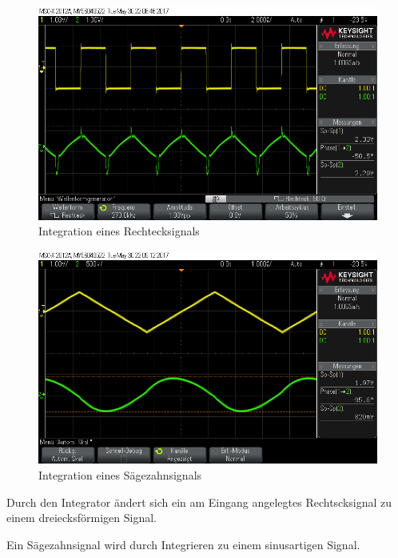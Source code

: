 \documentclass[10pt]{scrreprt}
\begin{document}
    \begin{center}
        \begin{figure}[H]
            \includegraphics[width=\textwidth]{scope_8.png}
            \caption{Integration eines Rechtecksignals}
        \end{figure}
    \end{center}
    \begin{center}
        \begin{figure}[H]
            \includegraphics[width=\textwidth]{scope_9.png}
            \caption{Integration eines Sägezahnsignals}
        \end{figure}
    \end{center}

    Durch den Integrator ändert sich ein am Eingang angelegtes Rechtscksignal
    zu einem dreiecksförmigen Signal.

    Ein Sägezahnsignal wird durch Integrieren zu einem sinusartigen Signal.
\end{document}

